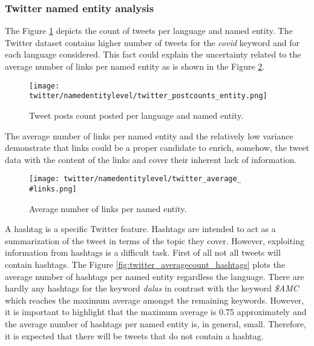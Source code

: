 \subsubsection{Twitter named entity analysis}

The Figure \ref{fig:twitter_postcounts_entity} depicts the count of tweets per language and named entity. The Twitter dataset contains higher number of tweets for the \textit{covid} keyword and for each language considered. This fact could explain the uncertainty related to the average number of links per named entity as is shown in the Figure \ref{fig:twitter_average_links}.
\begin{figure}[H]
	\begin{center}
		\texttt{[image: twitter/namedentitylevel/twitter\_postcounts\_entity.png]}
		\caption{Tweet posts count posted per language and named entity.}
		\label{fig:twitter_postcounts_entity}
	\end{center}
\end{figure}

The average number of links per named entity and the relatively low variance demonstrate that links could be a proper candidate to enrich, somehow, the tweet data with the content of the links and cover their inherent lack of information.
\begin{figure}[H]
	\begin{center}
		\texttt{[image: twitter/namedentitylevel/twitter\_average\_\\\#links.png]}
		\caption{Average number of links per named entity.}
		\label{fig:twitter_average_links}
	\end{center}
\end{figure}

\par A hashtag is a specific Twitter feature. Hashtags are intended to act as a summarization of the tweet in terms of the topic they cover. However, exploiting information from hashtags is a difficult task. First of all not all tweets will contain hashtags. The Figure \ref{fig:twitter_averagecount_hashtags} plots the average number of hashtags per named entity regardless the language. There are hardly any hashtags for the keyword \textit{dalas} in contrast with the keyword \textit{\$AMC} which reaches the maximum average amongst the remaining keywords. However, it is important to highlight that the maximum average is 0.75 approximately and the average number of hashtags per named entity is, in general, small. Therefore, it is expected that there will be tweets that do not contain a hashtag.

